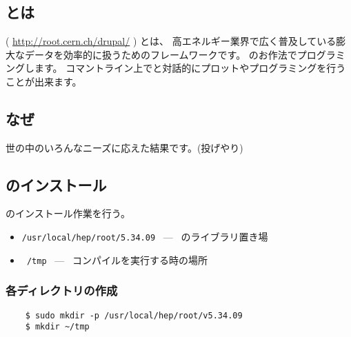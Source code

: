   \clearpage
 \section{\ROOT}


  \subsection{\ROOT とは}
  \ROOT ( \url{http://root.cern.ch/drupal/} ) とは、
  高エネルギー業界で広く普及している膨大なデータを効率的に扱うためのフレームワークです。
  \Cpp のお作法でプログラミングします。
  コマントライン上で\ROOT と対話的にプロットやプログラミングを行うことが出来ます。


  \subsection{なぜ\ROOT }
  世の中のいろんなニーズに応えた結果です。(投げやり)


  \subsection{\ROOT のインストール}
  \ROOT のインストール作業を行う。
  \begin{itemize}
   \item \texttt{/usr/local/hep/root/5.34.09} \ --- \ \ROOT のライブラリ置き場
   \item \texttt{~/tmp} \ --- \ コンパイルを実行する時の場所
  \end{itemize}


   \subsubsection*{各ディレクトリの作成}
\begin{verbatim}
	$ sudo mkdir -p /usr/local/hep/root/v5.34.09
	$ mkdir ~/tmp
\end{verbatim}


